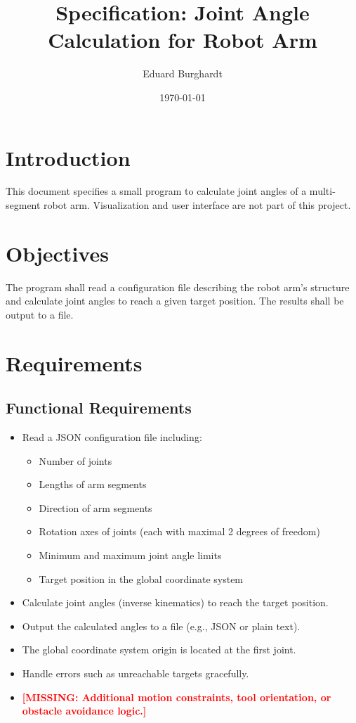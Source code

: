 \documentclass[a4paper,11pt]{article}
\title{Specification: Joint Angle Calculation for Robot Arm}
\author{Eduard Burghardt}
\date{\today}
\newcommand{\missing}[1]{\textbf{\textcolor{red}{[MISSING: #1]}}}
\begin{document}
	
	\maketitle
	
	\tableofcontents
	\newpage
	
	\section{Introduction}
	
	This document specifies a small program to calculate joint angles of a multi-segment robot arm.  
	Visualization and user interface are not part of this project.
	
	\section{Objectives}
	
	The program shall read a configuration file describing the robot arm’s structure and  
	calculate joint angles to reach a given target position. The results shall be output to a file.
	
	\section{Requirements}
	
	\subsection{Functional Requirements}
	
	\begin{itemize}
		\item Read a JSON configuration file including:
		\begin{itemize}
			\item Number of joints
			\item Lengths of arm segments
			\item Direction of arm segments
			\item Rotation axes of joints (each with maximal 2 degrees of freedom)
			\item Minimum and maximum joint angle limits
			\item Target position in the global coordinate system
		\end{itemize}
		\item Calculate joint angles (inverse kinematics) to reach the target position.
		\item Output the calculated angles to a file (e.g., JSON or plain text).
		\item The global coordinate system origin is located at the first joint.
		\item Handle errors such as unreachable targets gracefully.
		\item \missing{Additional motion constraints, tool orientation, or obstacle avoidance logic.}
	\end{itemize}
	
\end{document}
